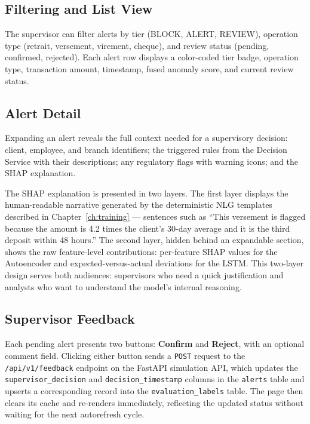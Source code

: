 \subsection{Filtering and List View}

The supervisor can filter alerts by tier (BLOCK, ALERT, REVIEW), operation
type (retrait, versement, virement, cheque), and review status (pending,
confirmed, rejected). Each alert row displays a color-coded tier badge,
operation type, transaction amount, timestamp, fused anomaly score, and
current review status.

\subsection{Alert Detail}

Expanding an alert reveals the full context needed for a supervisory
decision: client, employee, and branch identifiers; the triggered rules
from the Decision Service with their descriptions; any regulatory flags
with warning icons; and the SHAP explanation.

The SHAP explanation is presented in two layers. The first layer displays
the human-readable narrative generated by the deterministic NLG templates
described in Chapter~\ref{ch:training} --- sentences such as ``This
versement is flagged because the amount is 4.2 times the client's 30-day
average and it is the third deposit within 48 hours.'' The second layer,
hidden behind an expandable section, shows the raw feature-level
contributions: per-feature SHAP values for the Autoencoder and
expected-versus-actual deviations for the LSTM. This two-layer design
serves both audiences: supervisors who need a quick justification and
analysts who want to understand the model's internal reasoning.

\subsection{Supervisor Feedback}

Each pending alert presents two buttons: \textbf{Confirm} and
\textbf{Reject}, with an optional comment field. Clicking either button
sends a \texttt{POST} request to the \texttt{/api/v1/feedback} endpoint
on the FastAPI simulation API, which updates the \texttt{supervisor\_decision}
and \texttt{decision\_timestamp} columns in the \texttt{alerts} table and
upserts a corresponding record into the \texttt{evaluation\_labels} table.
The page then clears its cache and re-renders immediately, reflecting the
updated status without waiting for the next autorefresh cycle.


